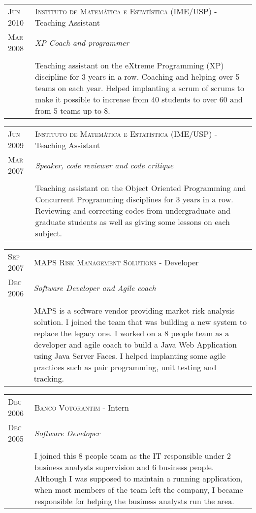 \documentclass[letter,10pt]{article}
\begin{document}
\begin{tabular}{p{2.5cm}|p{13.5cm}}
  \textsc{Jun 2010} & \textsc{Instituto de Matemática e Estatística
    (IME/USP)} - Teaching Assistant\\
  \textsc{Mar 2008}& \emph{XP Coach and programmer}\\
  &\\
  & Teaching assistant on the eXtreme Programming (XP) discipline for
  3 years in a row. Coaching and helping over 5 teams on each
  year. Helped implanting a scrum of scrums to make it possible to
  increase from 40 students to over 60 and from 5 teams up to 8.
\end{tabular}

\begin{tabular}{p{2.5cm}|p{13.5cm}}
  \textsc{Jun 2009} & \textsc{Instituto de Matemática e Estatística
    (IME/USP)} - Teaching Assistant\\
  \textsc{Mar 2007}& \emph{Speaker, code reviewer and code critique}\\
  &\\
  & Teaching assistant on the Object Oriented Programming and
  Concurrent Programming disciplines for
  3 years in a row. Reviewing and correcting codes from undergraduate
  and graduate students as well as giving some lessons on each subject.
\end{tabular}

\begin{tabular}{p{2.5cm}|p{13.5cm}}
  \textsc{Sep 2007} & \textsc{MAPS Risk
    Management Solutions} - Developer\\
  \textsc{Dec 2006} &\emph{Software Developer and Agile coach}\\
  &\\
  & MAPS is a software vendor providing market risk
  analysis solution. I joined the team that was building a new
  system to replace the legacy one. I worked on a 8 people team as a
  developer and agile coach to build a Java Web Application using
  Java Server Faces. I helped implanting some agile practices such as pair programming, unit
  testing and tracking.
\end{tabular}

\begin{tabular}{p{2.5cm}|p{13.5cm}}
  \textsc{Dec 2006} & \textsc{Banco Votorantim} - Intern\\
  \textsc{Dec 2005} &\emph{Software Developer}\\
  &\\
  &I joined this 8 people team as the IT responsible
  under 2 business analysts supervision and 6 business
  people. Although I was supposed to maintain a
  running application, when most members of the team left the company,
  I became responsible for helping the business analysts run the
  area.
\end{tabular}
\end{document}
